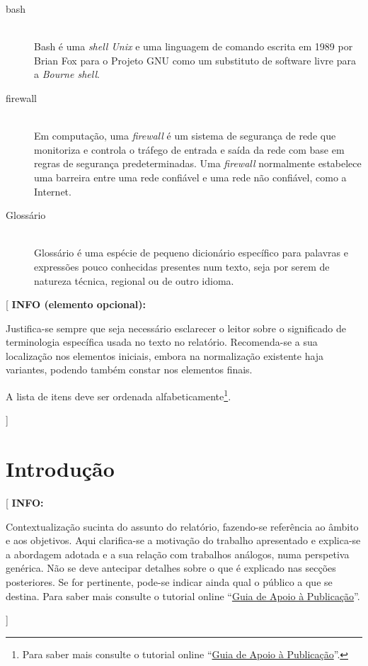 \documentclass[11pt,a4paper]{report}
\newenvironment{info}[1]{\vspace*{6mm}\color{blue}[ \textbf{INFO:} \begin{em} #1}{\vspace*{3mm}\end{em} ]}
\newenvironment{infoopt}[1]{\vspace*{6mm}\color{blue}[ \textbf{INFO (elemento opcional):} \begin{em} #1}{\vspace*{3mm}\end{em} ]}
\begin{document}
\begin{description}
\item[bash] \hfill \\
  Bash é uma \emph{shell Unix} e uma linguagem de comando escrita 
  em 1989 por Brian Fox para o Projeto GNU como um substituto de 
  software livre para a \emph{Bourne shell}.
\item[firewall] \hfill \\
  Em computação, uma \emph{firewall} é um sistema de segurança de rede 
  que monitoriza e controla o tráfego de entrada e saída da rede 
  com base em regras de segurança predeterminadas.
  Uma \emph{firewall} normalmente estabelece uma barreira entre uma 
  rede confiável e uma rede não confiável, como a Internet.
\item[Glossário] \hfill \\
  Glossário é uma espécie de pequeno dicionário específico para
  palavras e expressões pouco conhecidas presentes num texto, seja
  por serem de natureza técnica, regional ou de outro idioma.
\end{description}

\begin{infoopt}
Justifica-se sempre que seja necessário esclarecer o leitor sobre o
significado de terminologia específica usada no texto no relatório.
Recomenda-se a sua localização nos elementos iniciais, embora na
normalização existente haja variantes, podendo também constar nos
elementos finais.

A lista de itens deve ser ordenada alfabeticamente\footnote{%
Para saber mais consulte o tutorial online 
``\href{https://docs.google.com/document/d/1TDC1behVq8x7fQL4CcPEEh_np5GXviJevQxnQ9gbiJs/edit}
{Guia de Apoio à Publicação}''.}.
\end{infoopt}


\chapter{Introdução}

\pagestyle{fancy}
\setcounter{page}{1}

\begin{info}
Contextualização sucinta do assunto do relatório, fazendo-se
referência ao âmbito e aos objetivos.
Aqui clarifica-se a motivação do trabalho apresentado e explica-se a
abordagem adotada e a sua relação com trabalhos análogos, numa
perspetiva genérica.
Não se deve antecipar detalhes sobre o que é explicado nas secções
posteriores. 
Se for pertinente, pode-se indicar ainda qual o público a que se
destina.
Para saber mais consulte o tutorial online 
``\href{https://docs.google.com/document/d/1TDC1behVq8x7fQL4CcPEEh_np5GXviJevQxnQ9gbiJs/edit}
{Guia de Apoio à Publicação}''.
\end{info}
\end{document}
